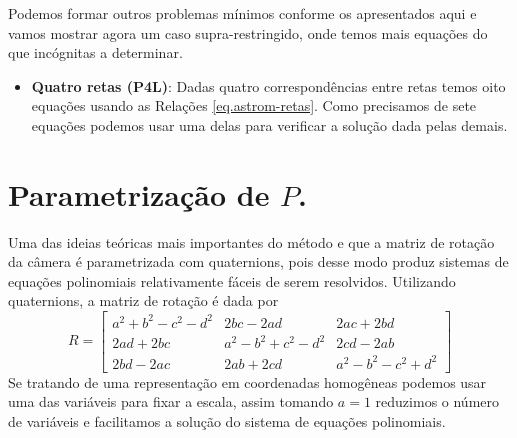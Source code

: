Podemos formar outros problemas mínimos conforme os apresentados aqui e vamos mostrar agora um caso supra-restringido, onde temos mais equações do que incógnitas a determinar.
\begin{itemize}
\item {\bf Quatro retas (P4L)}: Dadas quatro correspondências entre retas temos oito equações usando as Relações \ref{eq.astrom-retas}. Como precisamos de sete equações podemos usar uma delas para verificar a solução dada pelas demais.
\end{itemize}
\section*{Parametrização de $P$.}

Uma das ideias teóricas mais importantes do método e que a matriz de rotação da câmera é parametrizada com quaternions, pois desse modo produz sistemas de equações polinomiais relativamente fáceis de serem resolvidos. Utilizando quaternions, a matriz de rotação é dada por
\begin{equation*}
R=
\begin{bmatrix}
a^2+b^2-c^2-d^2&2bc-2ad&2ac+2bd\\
2ad+2bc&a^2-b^2+c^2-d^2&2cd-2ab\\
2bd-2ac&2ab+2cd&a^2-b^2-c^2+d^2
\end{bmatrix}
\end{equation*}
Se tratando de uma representação em coordenadas homogêneas podemos usar uma das variáveis para fixar a escala, assim tomando $a=1$ reduzimos o número de variáveis e facilitamos a solução do sistema de equações polinomiais.

